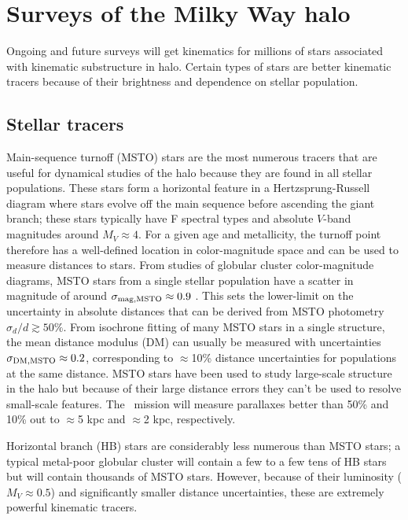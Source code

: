 \section{Surveys of the Milky Way halo} \label{sec:mw-surveys}

Ongoing and future surveys will get kinematics for millions of stars associated
with kinematic substructure in halo. Certain types of stars are better kinematic
tracers because of their brightness and dependence on stellar population.

\subsection{Stellar tracers}

Main-sequence turnoff (MSTO) stars are the most numerous tracers that are useful
for dynamical studies of the halo because they are found in all stellar
populations. These stars form a horizontal feature in a Hertzsprung-Russell
diagram where stars evolve off the main sequence before ascending the giant
branch; these stars typically have F spectral types and absolute $V$-band
magnitudes around $M_V \approx 4$. For a given age and metallicity, the turnoff
point therefore has a well-defined location in color-magnitude space and can be
used to measure distances to stars. From studies of globular cluster
color-magnitude diagrams, MSTO stars from a single stellar population have a
scatter in magnitude of around $\sigma_{\rm mag,MSTO} \approx 0.9$
\citep{bell08, bell10}. This sets the lower-limit on the uncertainty in absolute
distances that can be derived from MSTO photometry $\sigma_{d}/d \gtrsim 50\%$.
From isochrone fitting of many MSTO stars in a single structure, the mean
distance modulus (DM) can usually be measured with uncertainties $\sigma_{\rm
DM,MSTO} \approx 0.2$, corresponding to $\approx$10\% distance uncertainties for
populations at the same distance. MSTO stars have been used to study large-scale
structure in the halo \citep[e.g.,][]{newberg02} but because of their large
distance errors they can't be used to resolve small-scale features. The \gaia\
mission will measure parallaxes better than 50\% and 10\% out to $\approx$5
kpc and $\approx$2 kpc, respectively.

Horizontal branch (HB) stars are considerably less numerous than MSTO stars; a
typical metal-poor globular cluster will contain a few to a few tens of HB stars
but will contain thousands of MSTO stars. However, because of their luminosity
($M_V \approx 0.5$) and significantly smaller distance uncertainties, these are
extremely powerful kinematic tracers.

